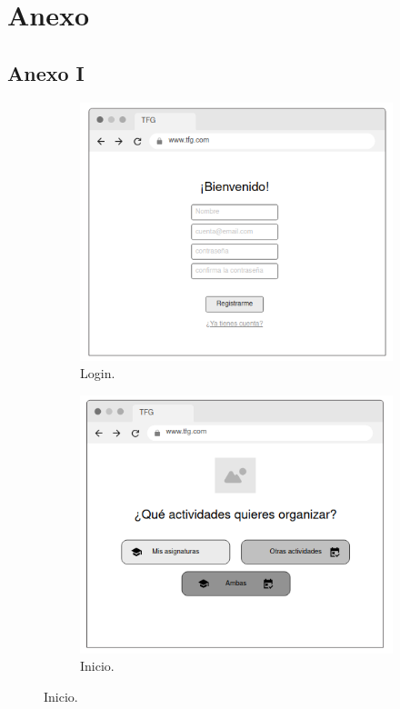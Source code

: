 
\vspace{-2cm}
\chapter*{Anexo}
\vspace{-2cm}
\section*{Anexo I}

\begin{figure}[H]
    \centering
    \begin{subfigure}[b]{0.48\textwidth}
        \includegraphics[width=\textwidth]{./imagenes/Mockup_login.png}
        \caption{Login.}
    \end{subfigure}
    \hfill
    \begin{subfigure}[b]{0.48\textwidth}
        \includegraphics[width=\textwidth]{./imagenes/Mockup_inicio.png}
        \caption{Inicio.}
    \end{subfigure}
    

\end{figure}

